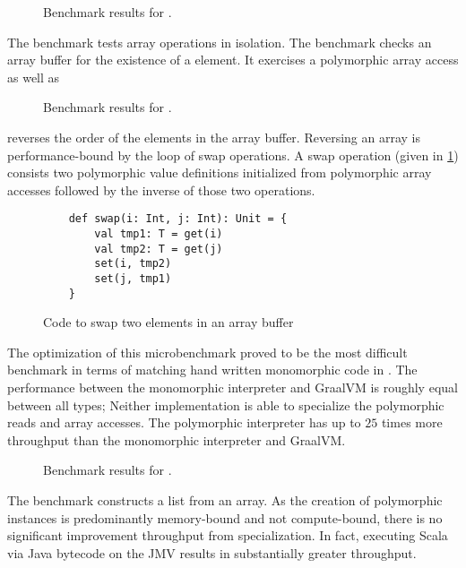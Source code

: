 \begin{figure}[!htb]
	\centering
	
	\caption{Benchmark results for .}
\end{figure}

The  benchmark tests array operations in isolation. 
The benchmark checks an array buffer for the existence of a element.
It exercises a polymorphic array access as well as 

\begin{figure}[!htb]
	\centering
	
	\caption{Benchmark results for .}
\end{figure}

 reverses the order of the elements in the array buffer.
Reversing an array is performance-bound by the loop of swap operations.
A swap operation (given in \ref{impl:swap}) consists two polymorphic value definitions initialized from polymorphic array accesses followed by the inverse of those two operations.

\begin{figure}[!htb]
\begin{verbatim}
	def swap(i: Int, j: Int): Unit = {
		val tmp1: T = get(i)
		val tmp2: T = get(j)
		set(i, tmp2)
		set(j, tmp1)
	}
\end{verbatim}
\caption{Code to swap two elements in an array buffer}
\label{impl:swap}
\end{figure}

The optimization of this microbenchmark proved to be the most difficult benchmark in terms of matching hand written monomorphic code in \cite{scala:miniboxing}.
The performance between the monomorphic interpreter and GraalVM is roughly equal between all types; 
Neither implementation is able to specialize the polymorphic reads and array accesses.
The polymorphic interpreter has up to $25$ times more throughput than the monomorphic interpreter and GraalVM.

\begin{figure}[!htb]
	\centering
	
	\caption{Benchmark results for .}
\end{figure}

The  benchmark constructs a list from an array.
As the creation of polymorphic instances is predominantly memory-bound and not compute-bound, there is no significant improvement throughput from specialization.
In fact, executing Scala via Java bytecode on the JMV results in substantially greater throughput.

